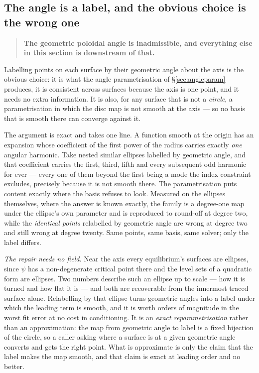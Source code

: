 \subsection{The angle is a label, and the obvious choice is the wrong one}

\begin{quote}
	\textbf{The geometric poloidal angle is inadmissible, and everything else in
	this section is downstream of that.}
\end{quote}

Labelling points on each surface by their geometric angle about the axis is the
obvious choice: it is what the angle parametrisation of
\S\ref{sec:angleparam} produces, it is
consistent across surfaces because the axis is one point, and it needs no extra
information. It is also, for any surface that is not a \emph{circle}, a
parametrisation in which the disc map is not smooth at the axis --- so no basis
that is smooth there can converge against it.

The argument is exact and takes one line. A function smooth at the origin has an
expansion whose coefficient of the first power of the radius carries exactly
\emph{one} angular harmonic. Take nested similar ellipses labelled by geometric
angle, and that coefficient carries the first, third, fifth and every subsequent
odd harmonic for ever --- every one of them beyond the first being a mode the
index constraint excludes, precisely because it is not smooth there. The
parametrisation puts content exactly where the basis refuses to look. Measured on
the ellipses themselves, where the answer is known exactly, the family is a
degree-one map under the ellipse's own parameter and is reproduced to round-off
at degree two, while the \emph{identical points} relabelled by geometric angle
are wrong at degree two and still wrong at degree twenty. Same points, same
basis, same solver; only the label differs.

\emph{The repair needs no field.} Near the axis every equilibrium's surfaces are
ellipses, since $\psi$ has a non-degenerate critical point there and the level
sets of a quadratic form are ellipses. Two numbers describe such an ellipse up to
scale --- how it is turned and how flat it is --- and both are recoverable from
the innermost traced surface alone. Relabelling by that ellipse turns geometric
angles into a label under which the leading term is smooth, and it is worth
orders of magnitude in the worst fit error at no cost in conditioning. It is an
\emph{exact reparametrisation} rather than an approximation: the map from
geometric angle to label is a fixed bijection of the circle, so a caller asking
where a surface is at a given geometric angle converts and gets the right point.
What is approximate is only the claim that the label makes the map smooth, and
that claim is exact at leading order and no better.

